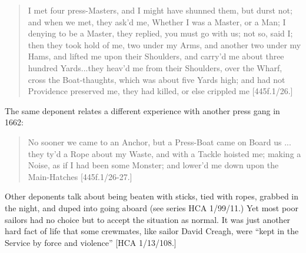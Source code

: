 \begin{quotation}
I met four press-Masters, and I might have shunned them, but durst not; and when we met, they ask’d me, Whether I was a Master, or a Man; I denying to be a Master, they replied, you must go with us; not so, said I; then they took hold of me, two under my Arms, and another two under my Hams, and lifted me upon their Shoulders, and carry’d me about three hundred Yards...they heav’d me from their Shoulders, over the Wharf, cross the Boat-thaughts, which was about five Yards high; and had not Providence preserved me, they had killed, or else crippled me [445f.1/26.]

\end{quotation}
\begin{styleStandard}
The same deponent relates a different experience with another press gang in 1662:
\end{styleStandard}


\begin{quotation}
No sooner we came to an Anchor, but a Press-Boat came on Board us ... they ty’d a Rope about my Waste, and with a Tackle hoisted me; making a Noise, as if I had been some Monster; and lower’d me down upon the Main-Hatches [445f.1/26-27.]

\end{quotation}
\begin{styleStandard}
Other deponents talk about being beaten with sticks, tied with ropes, grabbed in the night, and duped into going aboard (see series HCA 1/99/11.) Yet most poor sailors had no choice but to accept the situation as normal. It was just another hard fact of life that some crewmates, like sailor David Creagh, were “kept in the Service by force and violence” [HCA 1/13/108.] 
\end{styleStandard}


